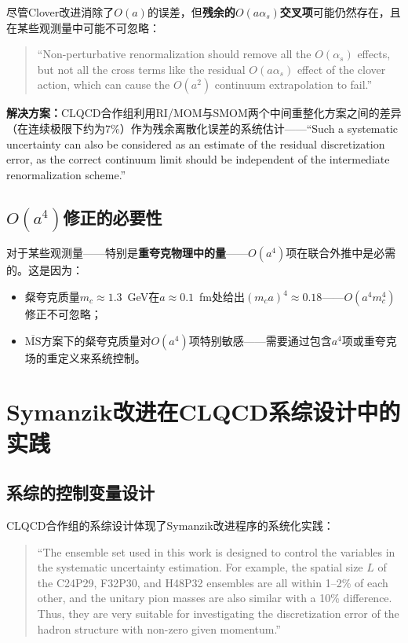 \documentclass[12pt,a4paper]{ctexart}
\theoremstyle{definition}
\begin{document}
尽管Clover改进消除了$O(a)$的误差，但\textbf{残余的$O(a\alpha_s)$交叉项}可能仍然存在，且在某些观测量中可能不可忽略\cite{CLQCD2025quark_mass}：

\begin{quote}
``Non-perturbative renormalization should remove all the $O(\alpha_s)$ effects, but not all the cross terms like the residual $O(a\alpha_s)$ effect of the clover action, which can cause the $O(a^2)$ continuum extrapolation to fail.''
\end{quote}

\textbf{解决方案：}CLQCD合作组利用RI/MOM与SMOM两个中间重整化方案之间的差异（在连续极限下约为$7\%$）作为残余离散化误差的系统估计——``Such a systematic uncertainty can also be considered as an estimate of the residual discretization error, as the correct continuum limit should be independent of the intermediate renormalization scheme.''\cite{CLQCD2025quark_mass}

\subsection{$O(a^4)$修正的必要性}

对于某些观测量——特别是\textbf{重夸克物理中的量}——$O(a^4)$项在联合外推中是必需的\cite{CLQCD2024charm}。这是因为：
\begin{itemize}
    \item 粲夸克质量$m_c \approx 1.3$~GeV在$a \approx 0.1$~fm处给出$(m_c a)^4 \approx 0.18$——$O(a^4 m^4_c)$修正不可忽略；
    \item $\overline{\text{MS}}$方案下的粲夸克质量对$O(a^4)$项特别敏感——需要通过包含$a^4$项或重夸克场的重定义来系统控制\cite{CLQCD2024charm}。
\end{itemize}

\section{Symanzik改进在CLQCD系综设计中的实践}

\subsection{系综的控制变量设计}

CLQCD合作组\cite{CLQCD2025quark_mass}的系综设计体现了Symanzik改进程序的系统化实践：

\begin{quote}
``The ensemble set used in this work is designed to control the variables in the systematic uncertainty estimation. For example, the spatial size $L$ of the C24P29, F32P30, and H48P32 ensembles are all within 1--2\% of each other, and the unitary pion masses are also similar with a 10\% difference. Thus, they are very suitable for investigating the discretization error of the hadron structure with non-zero given momentum.''
\end{quote}
\end{document}

